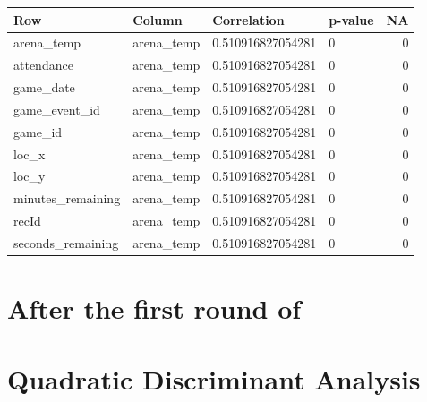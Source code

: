\documentclass[]{article}
\begin{document}
\begin{tabular}{l|l|l|l|r}
\hline
Row & Column & Correlation & p-value & NA\\
\hline
arena\_temp & arena\_temp & 0.510916827054281 & 0 & 0\\
\hline
attendance & arena\_temp & 0.510916827054281 & 0 & 0\\
\hline
game\_date & arena\_temp & 0.510916827054281 & 0 & 0\\
\hline
game\_event\_id & arena\_temp & 0.510916827054281 & 0 & 0\\
\hline
game\_id & arena\_temp & 0.510916827054281 & 0 & 0\\
\hline
loc\_x & arena\_temp & 0.510916827054281 & 0 & 0\\
\hline
loc\_y & arena\_temp & 0.510916827054281 & 0 & 0\\
\hline
minutes\_remaining & arena\_temp & 0.510916827054281 & 0 & 0\\
\hline
recId & arena\_temp & 0.510916827054281 & 0 & 0\\
\hline
seconds\_remaining & arena\_temp & 0.510916827054281 & 0 & 0\\
\hline
\end{tabular}

\hypertarget{after-the-first-round-of}{%
\section{After the first round of}\label{after-the-first-round-of}}

\hypertarget{quadratic-discriminant-analysis}{%
\section{\texorpdfstring{\textbf{Quadratic Discriminant
Analysis}}{Quadratic Discriminant Analysis}}\label{quadratic-discriminant-analysis}}
\end{document}
